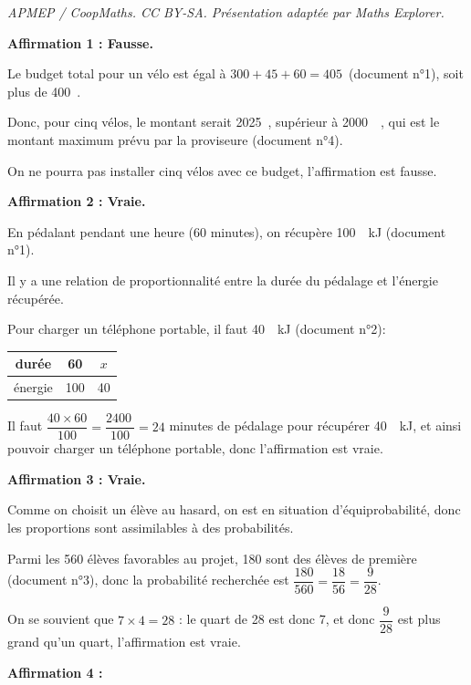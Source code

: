 \documentclass[10pt]{article}
\providecommand{\euro}{\texteuro}
\providecommand{\np}[2][]{{#2~#1}}
\providecommand{\euro}{{\text{€}}}
\renewcommand{\euro}{\ifmmode\text{\texteuro}\else\texteuro\fi}
\begin{document}
\noindent\textit{APMEP / CoopMaths. CC BY-SA. Présentation adaptée par Maths Explorer.}\par\medskip
\textbf{Affirmation 1 : Fausse.}

	Le budget total pour un vélo est égal à $300+45+60 = 405$~\euro (document n°1), soit plus de 400~\euro.

	Donc, pour cinq vélos, le montant serait \np[\euro]{2025}, supérieur à \np{2000}~\euro, qui est le montant maximum prévu par la proviseure (document n°4).

	On ne pourra pas installer cinq vélos avec ce budget, l'affirmation est fausse.

\vspace{5mm}
\textbf{Affirmation 2 : Vraie.}

	En pédalant pendant une heure (60 minutes), on récupère \np[~kJ]{100} (document n°1).

	Il y a une relation de proportionnalité entre la durée du pédalage et l'énergie récupérée.

	Pour charger un téléphone portable, il faut \np[~kJ]{40} (document n°2):

	\begin{tabular}{c|c|c}
		durée&60  &$x$ \\\hline
		énergie&100  & 40 \\
	\end{tabular}\quad
	Il faut $\dfrac{40\times60}{100} = \dfrac{\np{2400}}{100} = 24$ minutes de pédalage pour récupérer \np[~kJ]{40}, et ainsi pouvoir charger un téléphone portable, donc l'affirmation est vraie.

\vspace{5mm}
\textbf{Affirmation 3 : Vraie.}

	Comme on choisit un élève au hasard, on est en situation d'équiprobabilité, donc les proportions sont assimilables à des probabilités.

	Parmi les 560 élèves favorables au projet, 180 sont des élèves de première (document n°3), donc la probabilité recherchée est $\dfrac{180}{560} = \dfrac{18}{56} = \dfrac{9}{28}$.

	On se souvient que $7\times4 = 28$ : le quart de 28 est donc 7, et donc $\dfrac{9}{28}$ est plus grand qu'un quart, l'affirmation est vraie.

\vspace{5mm}
\textbf{Affirmation 4 :}
\end{document}
